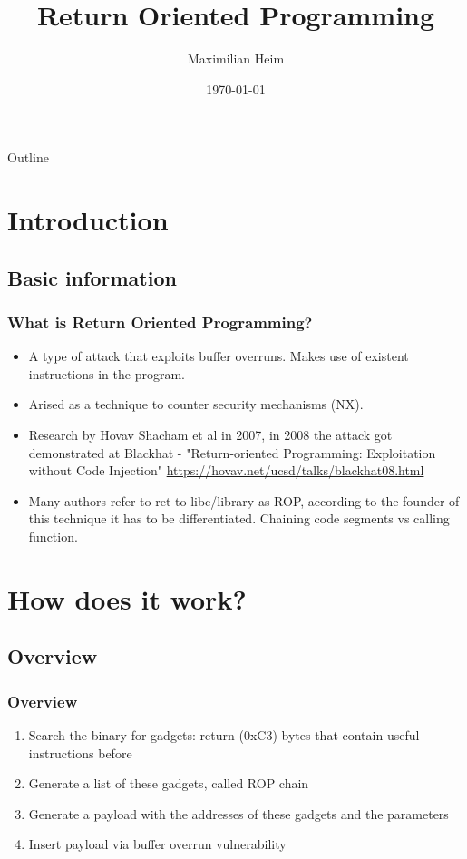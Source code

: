 \documentclass[11pt]{beamer}
\author{Maximilian Heim}
\title{Return Oriented Programming}
\institute{University Albstadt-Sigmaringen}
\date{\today}
\begin{document}
\begin{frame}
\titlepage
\end{frame}

\begin{frame}{Outline}
\tableofcontents
\end{frame}

\section{Introduction}
\subsection{Basic information}
\begin{frame}
    \frametitle{What is Return Oriented Programming?}
    \begin{itemize}
    \item A type of attack that exploits buffer overruns. Makes use of existent instructions in the program.
    \item Arised as a technique to counter security mechanisms (NX).
    \item Research by Hovav Shacham et al in 2007, in 2008 the attack got demonstrated at Blackhat - "Return-oriented Programming: Exploitation without Code Injection" \url{https://hovav.net/ucsd/talks/blackhat08.html}
    \item Many authors refer to ret-to-libc/library as ROP, according to the founder of this technique it has to be differentiated. Chaining code segments vs calling function.
    \end{itemize}
\end{frame}

\section{How does it work?}
\subsection{Overview}
\begin{frame}
    \frametitle{Overview}
    \begin{enumerate}
        \item Search the binary for gadgets: return (0xC3) bytes that contain useful instructions before
        \item Generate a list of these gadgets, called ROP chain
        \item Generate a payload with the addresses of these gadgets and the parameters
        \item Insert payload via buffer overrun vulnerability
    \end{enumerate} 
\end{frame}
\end{document}
